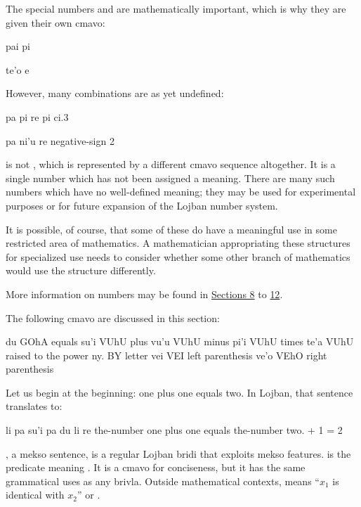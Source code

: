 The special numbers  and  are mathematically
    important, which is why they are given their own cmavo:
\begin{example}
pai\n
pi
\end{example}

\begin{example}
te'o\n
e
\end{example}

However, many combinations are as yet undefined:
\begin{example}
pa pi re pi ci.3
\end{example}

\begin{example}
pa ni'u re negative-sign 2
\end{example}

 is not , which is
    represented by a different cmavo sequence altogether. It is a
    single number which has not been assigned a meaning. There are
    many such numbers which have no well-defined meaning; they may
    be used for experimental purposes or for future expansion of
    the Lojban number system. 

It is possible, of course, that some of these 
    do have a meaningful use in some restricted area of
    mathematics. A mathematician appropriating these structures for
    specialized use needs to consider whether some other branch of
    mathematics would use the structure differently.

More information on numbers may be found in \hyperref[sec:18:8]{Sections 8} to \hyperref[sec:18:12]{12}.



The following cmavo are discussed in this section:

   du  GOhA    equals
    su'i    VUhU    plus
    vu'u    VUhU    minus
    pi'i    VUhU    times
    te'a    VUhU    raised to the power
    ny. BY  letter 
    vei VEI left parenthesis
    ve'o    VEhO    right parenthesis

Let us begin at the beginning: one plus one equals two. In
    Lojban, that sentence translates to:
\begin{example}
li pa su'i pa du li re\n
the-number one plus one equals the-number two. + 1 = 2
\end{example}

, a mekso sentence, is a regular
    Lojban bridi that exploits mekso features.  is the
    predicate meaning . It is a
    cmavo for conciseness, but it has the same grammatical uses as
    any brivla. Outside mathematical contexts,  means ``$x_1$ is
    identical with $x_2$'' or . 

